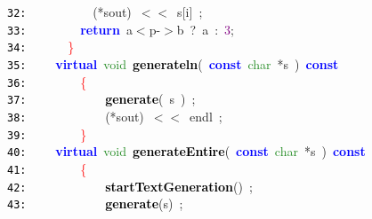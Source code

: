 \documentclass{article}
\begin{document}
\mbox{}\texttt{\textcolor{Black}{32:}} \ \ \ \ \ \ \ \ \ \ \textcolor{BrickRed}{(*}sout\textcolor{BrickRed}{)}\ \textcolor{BrickRed}{$<$$<$}\ s\textcolor{BrickRed}{[}i\textcolor{BrickRed}{]}\ \textcolor{BrickRed}{;} \\
\mbox{}\texttt{\textcolor{Black}{33:}} \ \ \ \ \ \ \ \ \textbf{\textcolor{Blue}{return}}\ a\textcolor{BrickRed}{$<$}p\textcolor{BrickRed}{-$>$}b\ \textcolor{BrickRed}{?}\ a\ \textcolor{BrickRed}{:}\ \textcolor{Purple}{3}\textcolor{BrickRed}{;} \\
\mbox{}\texttt{\textcolor{Black}{34:}} \ \ \ \ \ \ \textcolor{Red}{\}} \\
\mbox{}\texttt{\textcolor{Black}{35:}} \ \ \ \ \textbf{\textcolor{Blue}{virtual}}\ \textcolor{ForestGreen}{void}\ \textbf{\textcolor{Black}{\label{test.h:35}generateln}}\textcolor{BrickRed}{(}\ \textbf{\textcolor{Blue}{const}}\ \textcolor{ForestGreen}{char}\ \textcolor{BrickRed}{*}s\ \textcolor{BrickRed}{)}\ \textbf{\textcolor{Blue}{const}} \\
\mbox{}\texttt{\textcolor{Black}{36:}} \ \ \ \ \ \ \ \ \textcolor{Red}{\{}\  \\
\mbox{}\texttt{\textcolor{Black}{37:}} \ \ \ \ \ \ \ \ \ \ \ \ \textbf{\textcolor{Black}{generate}}\textcolor{BrickRed}{(}\ s\ \textcolor{BrickRed}{)}\ \textcolor{BrickRed}{;} \\
\mbox{}\texttt{\textcolor{Black}{38:}} \ \ \ \ \ \ \ \ \ \ \ \ \textcolor{BrickRed}{(*}sout\textcolor{BrickRed}{)}\ \textcolor{BrickRed}{$<$$<$}\ endl\ \textcolor{BrickRed}{;}\  \\
\mbox{}\texttt{\textcolor{Black}{39:}} \ \ \ \ \ \ \ \ \textcolor{Red}{\}} \\
\mbox{}\texttt{\textcolor{Black}{40:}} \ \ \ \ \textbf{\textcolor{Blue}{virtual}}\ \textcolor{ForestGreen}{void}\ \textbf{\textcolor{Black}{\label{test.h:40}generateEntire}}\textcolor{BrickRed}{(}\ \textbf{\textcolor{Blue}{const}}\ \textcolor{ForestGreen}{char}\ \textcolor{BrickRed}{*}s\ \textcolor{BrickRed}{)}\ \textbf{\textcolor{Blue}{const}} \\
\mbox{}\texttt{\textcolor{Black}{41:}} \ \ \ \ \ \ \ \ \textcolor{Red}{\{} \\
\mbox{}\texttt{\textcolor{Black}{42:}} \ \ \ \ \ \ \ \ \ \ \ \ \textbf{\textcolor{Black}{startTextGeneration}}\textcolor{BrickRed}{()}\ \textcolor{BrickRed}{;} \\
\mbox{}\texttt{\textcolor{Black}{43:}} \ \ \ \ \ \ \ \ \ \ \ \ \textbf{\textcolor{Black}{generate}}\textcolor{BrickRed}{(}s\textcolor{BrickRed}{)}\ \textcolor{BrickRed}{;} \\
\end{document}
